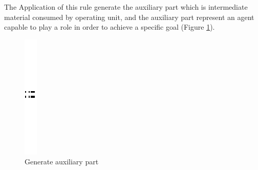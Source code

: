 The Application of this rule generate the auxiliary part which is intermediate material consumed by operating unit, and the auxiliary part represent an agent capable to play a role in order to achieve a specific goal (Figure \ref{fig:Generate auxiliary part}).
\vspace{1cm}
\begin{figure}[th]
\centering 
	\quad{}
		\includegraphics{ch3/img/sep}
	\quad{}
\caption{\label{fig:Generate auxiliary part} Generate auxiliary part}
\end{figure}
\pagebreak


